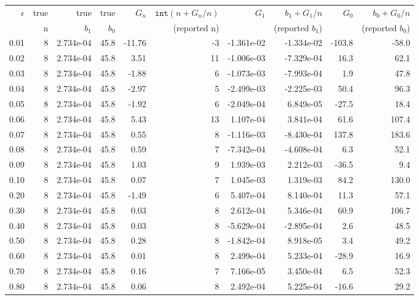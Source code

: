 \begin{tabular}{rrrrrrrrrr}
$\epsilon$ &  true &  true &  true &  $G_n$ &  $\texttt{int}(n+G_n/n)$ &  $G_1$ &  $b_1 + G_1/n$ &  $G_0$ &  $b_0 + G_0/n$\\ 
 &  n &  $b_1$ &  $b_0$ &   &  (reported n) &   &  (reported $b_1$) &   &  (reported $b_0$)\\ 
\hline
 \hline
 0.01 &  8 &  2.734e-04 &  45.8 &  -11.76 &  -3 &  -1.361e-02 &  -1.334e-02 &  -103.8 &  -58.0\\ 
0.02 &  8 &  2.734e-04 &  45.8 &  3.51 &  11 &  -1.006e-03 &  -7.329e-04 &  16.3 &  62.1\\ 
0.03 &  8 &  2.734e-04 &  45.8 &  -1.88 &  6 &  -1.073e-03 &  -7.993e-04 &  1.9 &  47.8\\ 
0.04 &  8 &  2.734e-04 &  45.8 &  -2.97 &  5 &  -2.499e-03 &  -2.225e-03 &  50.4 &  96.3\\ 
0.05 &  8 &  2.734e-04 &  45.8 &  -1.92 &  6 &  -2.049e-04 &  6.849e-05 &  -27.5 &  18.4\\ 
0.06 &  8 &  2.734e-04 &  45.8 &  5.43 &  13 &  1.107e-04 &  3.841e-04 &  61.6 &  107.4\\ 
0.07 &  8 &  2.734e-04 &  45.8 &  0.55 &  8 &  -1.116e-03 &  -8.430e-04 &  137.8 &  183.6\\ 
0.08 &  8 &  2.734e-04 &  45.8 &  0.59 &  7 &  -7.342e-04 &  -4.608e-04 &  6.3 &  52.1\\ 
0.09 &  8 &  2.734e-04 &  45.8 &  1.03 &  9 &  1.939e-03 &  2.212e-03 &  -36.5 &  9.4\\ 
\hline
 0.10 &  8 &  2.734e-04 &  45.8 &  0.07 &  7 &  1.045e-03 &  1.319e-03 &  84.2 &  130.0\\ 
0.20 &  8 &  2.734e-04 &  45.8 &  -1.49 &  6 &  5.407e-04 &  8.140e-04 &  11.3 &  57.1\\ 
0.30 &  8 &  2.734e-04 &  45.8 &  0.03 &  8 &  2.612e-04 &  5.346e-04 &  60.9 &  106.7\\ 
0.40 &  8 &  2.734e-04 &  45.8 &  0.03 &  8 &  -5.629e-04 &  -2.895e-04 &  2.6 &  48.5\\ 
0.50 &  8 &  2.734e-04 &  45.8 &  0.28 &  8 &  -1.842e-04 &  8.918e-05 &  3.4 &  49.2\\ 
0.60 &  8 &  2.734e-04 &  45.8 &  0.01 &  8 &  2.499e-04 &  5.233e-04 &  -28.9 &  16.9\\ 
0.70 &  8 &  2.734e-04 &  45.8 &  0.16 &  7 &  7.166e-05 &  3.450e-04 &  6.5 &  52.3\\ 
0.80 &  8 &  2.734e-04 &  45.8 &  0.06 &  8 &  2.492e-04 &  5.225e-04 &  -16.6 &  29.2\\ 

\end{tabular}
